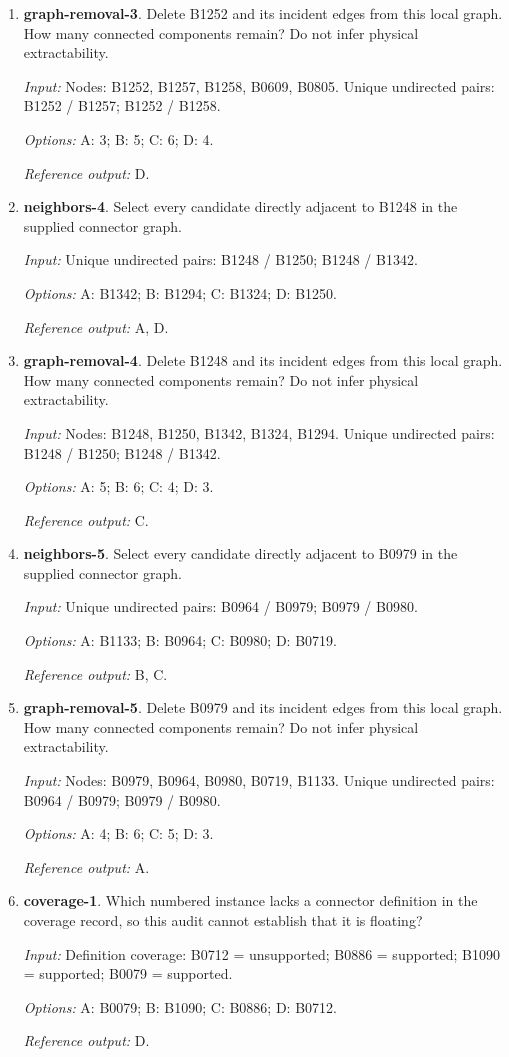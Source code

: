 \begin{enumerate}
\item \textbf{graph-removal-3}. Delete B1252 and its incident edges from this local graph. How many connected components remain? Do not infer physical extractability.\par {\small \textit{Input:} Nodes: B1252, B1257, B1258, B0609, B0805. Unique undirected pairs: B1252 / B1257; B1252 / B1258. \par\textit{Options:} A: 3; B: 5; C: 6; D: 4. \par\textit{Reference output:} D.}
\item \textbf{neighbors-4}. Select every candidate directly adjacent to B1248 in the supplied connector graph.\par {\small \textit{Input:} Unique undirected pairs: B1248 / B1250; B1248 / B1342. \par\textit{Options:} A: B1342; B: B1294; C: B1324; D: B1250. \par\textit{Reference output:} A, D.}
\item \textbf{graph-removal-4}. Delete B1248 and its incident edges from this local graph. How many connected components remain? Do not infer physical extractability.\par {\small \textit{Input:} Nodes: B1248, B1250, B1342, B1324, B1294. Unique undirected pairs: B1248 / B1250; B1248 / B1342. \par\textit{Options:} A: 5; B: 6; C: 4; D: 3. \par\textit{Reference output:} C.}
\item \textbf{neighbors-5}. Select every candidate directly adjacent to B0979 in the supplied connector graph.\par {\small \textit{Input:} Unique undirected pairs: B0964 / B0979; B0979 / B0980. \par\textit{Options:} A: B1133; B: B0964; C: B0980; D: B0719. \par\textit{Reference output:} B, C.}
\item \textbf{graph-removal-5}. Delete B0979 and its incident edges from this local graph. How many connected components remain? Do not infer physical extractability.\par {\small \textit{Input:} Nodes: B0979, B0964, B0980, B0719, B1133. Unique undirected pairs: B0964 / B0979; B0979 / B0980. \par\textit{Options:} A: 4; B: 6; C: 5; D: 3. \par\textit{Reference output:} A.}
\item \textbf{coverage-1}. Which numbered instance lacks a connector definition in the coverage record, so this audit cannot establish that it is floating?\par {\small \textit{Input:} Definition coverage: B0712 = unsupported; B0886 = supported; B1090 = supported; B0079 = supported. \par\textit{Options:} A: B0079; B: B1090; C: B0886; D: B0712. \par\textit{Reference output:} D.}

\end{enumerate}

